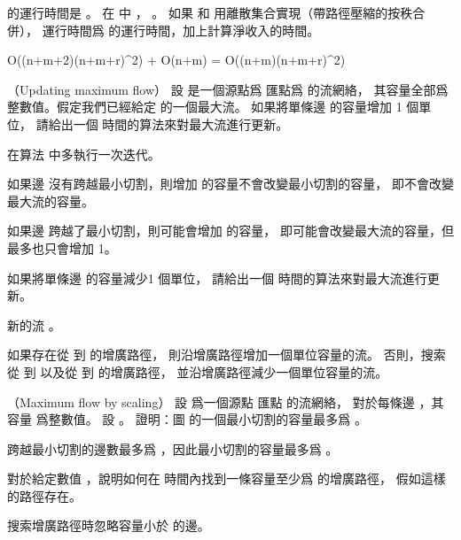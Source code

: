 \startANSWER
{} 的運行時間是 。
在  中 ， 。
如果  和  用離散集合實現（帶路徑壓縮的按秩合併），
運行時間爲  的運行時間，加上計算淨收入的時間。

\startformula
O((n+m+2)\times (n+m+r)^2) + O(n+m) = O((n+m)\times(n+m+r)^2)
\stopformula

\stopANSWER

\stopPROBLEM

\startPROBLEM
（Updating maximum flow）
設  是一個源點爲  匯點爲  的流網絡，
其容量全部爲整數值。假定我們已經給定  的一個最大流。
\startigBase[a]\startitem
如果將單條邊  的容量增加 1 個單位，
請給出一個  時間的算法來對最大流進行更新。
\stopitem\stopigBase

\startANSWER
在算法  中多執行一次迭代。

如果邊  沒有跨越最小切割，則增加  的容量不會改變最小切割的容量，
即不會改變最大流的容量。

如果邊  跨越了最小切割，則可能會增加  的容量，
即可能會改變最大流的容量，但最多也只會增加 1。
\stopANSWER

\startigBase[continue]\startitem
如果將單條邊  的容量減少1 個單位，
請給出一個  時間的算法來對最大流進行更新。
\stopitem\stopigBase

\startANSWER
新的流 。

如果存在從  到  的增廣路徑，
則沿增廣路徑增加一個單位容量的流。
否則，搜索從  到  以及從  到  的增廣路徑，
並沿增廣路徑減少一個單位容量的流。
\stopANSWER

\stopPROBLEM

\startPROBLEM
（Maximum flow by scaling）
設  爲一個源點  匯點  的流網絡，
對於每條邊 ，其容量  爲整數值。
設 。
\startigBase[a]\startitem
證明：圖  的一個最小切割的容量最多爲 。
\stopitem\stopigBase

\startANSWER
跨越最小切割的邊數最多爲 ，因此最小切割的容量最多爲 。
\stopANSWER

\startigBase[continue]\startitem
對於給定數值 ，說明如何在  時間內找到一條容量至少爲  的增廣路徑，
假如這樣的路徑存在。
\stopitem\stopigBase

\startANSWER
搜索增廣路徑時忽略容量小於  的邊。
\stopANSWER

